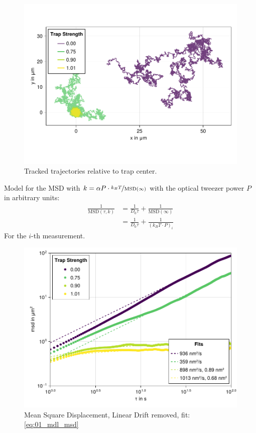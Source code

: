 \documentclass[
    parskip=half, 
    twoside=false,
    twocolumn=true,
    fontsize=11pt,
]{scrarticle}
\begin{document}
\begin{figure}[h]
    \centering
    \includegraphics{figures/01_02_1_trajectories.pdf}
    \caption{Tracked trajectories relative to trap center.}
\end{figure}

Model for the MSD with $k=\alpha P \cdot\nicefrac{k_B T}{\text{MSD}(\infty)}$ with the optical tweezer power $P$ in arbitrary units:
\begin{align}
    \frac{1}{\text{MSD}(\tau, k)}
    &= \frac{1}{D_0 \tau} + \frac{1}{\text{MSD}(\infty)}\\
    &= \frac{1}{D_0 \tau} + \frac{1}{(k_B T \cdot P)_i}
    \label{eq:01_mdl_msd} 
\end{align}
For the $i$-th measurement.

\begin{figure}[h]
    \centering
    \includegraphics{figures/01_02_2_msd.pdf}
    \caption{Mean Square Displacement, Linear Drift removed, fit: \autoref{eq:01_mdl_msd}}
\end{figure}
\end{document}

